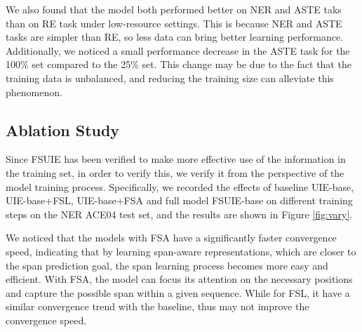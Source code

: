 \documentclass[11pt]{article}
\begin{document}
We also found that the model both performed better on NER and ASTE taks than on RE task under low-resource settings. This is because NER and ASTE tasks are simpler than RE, so less data can bring better learning performance. Additionally, we noticed a small performance decrease in the ASTE task for the 100\% set compared to the 25\% set. This change may be due to the fact that the training data is unbalanced, and reducing the training size can alleviate this phenomenon.



\subsection{Ablation Study}


Since FSUIE has been verified to make more effective use of the information in the training set, in order to verify this, we verify it from the perspective of the model training process. Specifically, we recorded the effects of baseline UIE-base, UIE-base+FSL, UIE-base+FSA and full model FSUIE-base on different training steps on the NER ACE04 test set, and the results are shown in Figure \ref{fig:vary}.

We noticed that the models with FSA have a significantly faster convergence speed, indicating that by learning span-aware representations, which are closer to the span prediction goal, the span learning process becomes more easy and efficient. With FSA, the model can focus its attention on the necessary positions and capture the possible span within a given sequence. While for FSL, it have a similar convergence trend with the baseline, thus may not improve the convergence speed.
\end{document}
